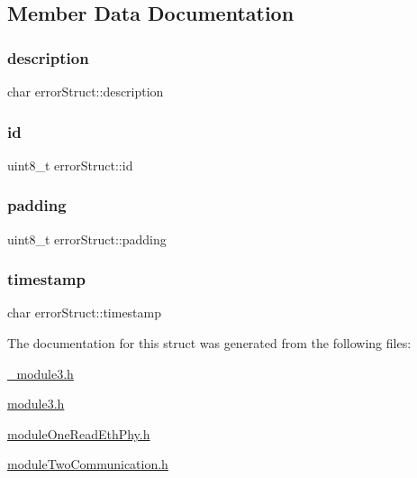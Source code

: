 \subsection{Member Data Documentation}
\mbox{\label{structerror_struct_aed437236613db32b2b56361e2cbf3ce6}} 
\subsubsection{\texorpdfstring{description}{description}}
{\footnotesize\ttfamily char error\+Struct\+::description}

\mbox{\label{structerror_struct_af07d527b0695dad43376f6658ca6d9d3}} 
\subsubsection{\texorpdfstring{id}{id}}
{\footnotesize\ttfamily uint8\+\_\+t error\+Struct\+::id}

\mbox{\label{structerror_struct_a14bf4c23e01145e362768dfdc4466737}} 
\subsubsection{\texorpdfstring{padding}{padding}}
{\footnotesize\ttfamily uint8\+\_\+t error\+Struct\+::padding}

\mbox{\label{structerror_struct_a51e5ae4be96680737622f257e2eb2479}} 
\subsubsection{\texorpdfstring{timestamp}{timestamp}}
{\footnotesize\ttfamily char error\+Struct\+::timestamp}



The documentation for this struct was generated from the following files\+:\begin{DoxyCompactItemize}
\item 
\mbox{\hyperlink{__module3_8h}{\+\_\+module3.\+h}}\item 
\mbox{\hyperlink{module3_8h}{module3.\+h}}\item 
\mbox{\hyperlink{module_one_read_eth_phy_8h}{module\+One\+Read\+Eth\+Phy.\+h}}\item 
\mbox{\hyperlink{module_two_communication_8h}{module\+Two\+Communication.\+h}}\end{DoxyCompactItemize}
